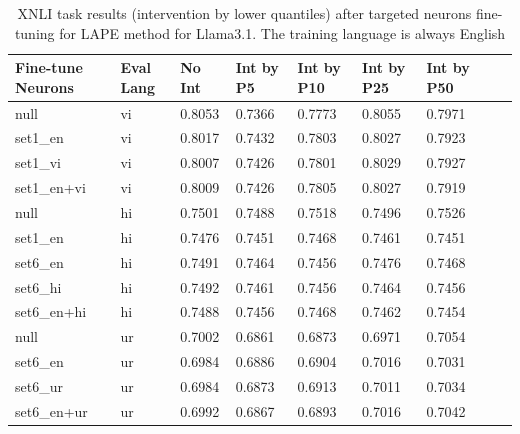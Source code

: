 \begin{table}[ht]
	\centering
	\renewcommand{\arraystretch}{1.3}
	\setlength{\tabcolsep}{4pt}
	\begin{tabularx}{\textwidth}{|X|X|X|X|X|X|X|X|X|}
		\hline
		\textbf{Fine-tune Neurons} & \textbf{Eval Lang} & \textbf{No Int} & \textbf{Int by P5} & \textbf{Int by P10} & \textbf{Int by P25} & \textbf{Int by P50} \\
		\hline
		null & vi & 0.8053 & 0.7366 & 0.7773 & 0.8055 & 0.7971 \\
		set1\_en & vi & 0.8017 & 0.7432 & 0.7803 & 0.8027 & 0.7923 \\
		set1\_vi & vi & 0.8007 & 0.7426 & 0.7801 & 0.8029 & 0.7927 \\
		set1\_en+vi & vi & 0.8009 & 0.7426 & 0.7805 & 0.8027 & 0.7919 \\
		\hline
		null & hi & 0.7501 & 0.7488 & 0.7518 & 0.7496 & 0.7526 \\
		set1\_en & hi & 0.7476 & 0.7451 & 0.7468 & 0.7461 & 0.7451 \\
		set6\_en & hi & 0.7491 & 0.7464 & 0.7456 & 0.7476 & 0.7468 \\
		set6\_hi & hi & 0.7492 & 0.7461 & 0.7456 & 0.7464 & 0.7456 \\
		set6\_en+hi & hi & 0.7488 & 0.7456 & 0.7468 & 0.7462 & 0.7454 \\
		\hline
		null & ur & 0.7002 & 0.6861 & 0.6873 & 0.6971 & 0.7054 \\
		set6\_en & ur & 0.6984 & 0.6886 & 0.6904 & 0.7016 & 0.7031 \\
		set6\_ur & ur & 0.6984 & 0.6873 & 0.6913 & 0.7011 & 0.7034 \\
		set6\_en+ur & ur & 0.6992 & 0.6867 & 0.6893 & 0.7016 & 0.7042 \\
		\hline
	\end{tabularx}
	\caption{XNLI task results (intervention by lower quantiles) after targeted neurons fine-tuning for LAPE method for Llama3.1. The training language is always English}
	\label{tab:xnli_additional_results}
\end{table}

